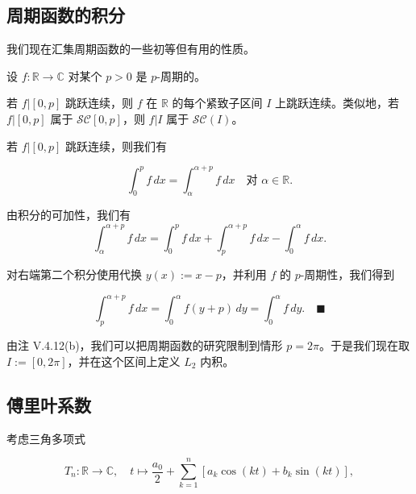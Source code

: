 \subsection*{周期函数的积分}

我们现在汇集周期函数的一些初等但有用的性质。

\begin{remark}

设 $ f : \mathbb{R} \to \mathbb{C} $ 对某个 $ p > 0 $ 是 $ p $-周期的。

\begin{items}
\item

若 $ f|[0, p] $ 跳跃连续，则 $ f $ 在 $ \mathbb{R} $ 的每个紧致子区间 $ I $ 上跳跃连续。类似地，若 $ f|[0, p] $ 属于 $ \mathcal{SC}[0, p] $，则 $ f|I $ 属于 $ \mathcal{SC}(I) $。

\item

若 $ f|[0, p] $ 跳跃连续，则我们有

\[
\int_{0}^{p} f \, dx = \int_{\alpha}^{\alpha+p} f \, dx \quad \text{对 } \alpha \in \mathbb{R} .
\]

\proofhead
由积分的可加性，我们有
\[
\int_{\alpha}^{\alpha+p} f \, dx = \int_{0}^{p} f \, dx + \int_{p}^{\alpha+p} f \, dx - \int_{0}^{\alpha} f \, dx .
\]

对右端第二个积分使用代换 $ y(x) := x - p $，并利用 $ f $ 的 $ p $-周期性，我们得到

\[
\int_{p}^{\alpha+p} f \, dx = \int_{0}^{\alpha} f(y + p) \, dy = \int_{0}^{\alpha} f \, dy .\quad\blacksquare
\]

由注 V.4.12(b)，我们可以把周期函数的研究限制到情形 $ p = 2\pi $。于是我们现在取 $ I := [0, 2\pi] $，并在这个区间上定义 $ L_{2} $ 内积。

\end{items}

\end{remark}

\subsection*{傅里叶系数}

考虑三角多项式

\begin{equation}
T_{n} : \mathbb{R} \to \mathbb{C} , \quad t \mapsto \frac{a_{0}}{2} + \sum_{k=1}^{n}[a_{k}\cos(kt) + b_{k}\sin(kt)] ,\tag{7.7}
\end{equation}

